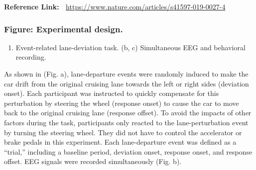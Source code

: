 \documentclass[letterpaper]{article}
\begin{document}
\bigskip

\textbf{Reference Link: \ }\url{https://www.nature.com/articles/s41597-019-0027-4}


\bigskip

\centering
{}
\par
\subsubsection[Figure: Experimental design.]{\textbf{Figure: }Experimental design.}
\begin{enumerate}[series=listWWNumiv,label=(\alph*),ref=\alph*]
\item {\centering
Event-related lane-deviation task. (b, c) Simultaneous EEG and behavioral recording.
\par}
\end{enumerate}

\bigskip

As shown in (Fig. a), lane-departure events were randomly induced to make the car drift from the original cruising lane
towards the left or right sides (deviation onset). Each participant was instructed to quickly compensate for this
perturbation by steering the wheel (response onset) to cause the car to move back to the original cruising lane
(response offset). To avoid the impacts of other factors during the task, participants only reacted to the
lane-perturbation event by turning the steering wheel. They did not have to control the accelerator or brake pedals in
this experiment. Each lane-departure event was defined as a “trial,” including a baseline period, deviation onset,
response onset, and response offset. EEG signals were recorded simultaneously (Fig. b).
\end{document}
